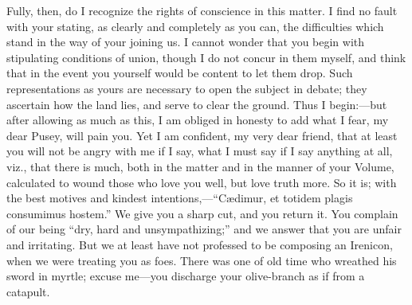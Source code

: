 Fully, then, do I recognize the rights of conscience in this matter.
I find no fault with your stating, as clearly and completely as you can,
the difficulties which stand in the way of your joining us. I cannot
wonder that you begin with stipulating conditions of union, though I do
not concur in them myself, and think that in the event you yourself
would be content to let them drop. Such representations as yours are
necessary to open the subject in debate; they ascertain how the land
lies, and serve to clear the ground. Thus I begin:—but after allowing
as much as this, I am obliged in honesty to add what I fear, my dear
Pusey, will pain you. Yet I am confident, my very dear friend, that at
least you will not be angry with me if I say, what I must say if I say
anything at all, viz., that there is much, both in the matter and in the
manner of your Volume, calculated to wound those who love you well, but
love truth more. So it is; with the best motives and kindest intentions,—``Cædimur,
et totidem plagis consumimus hostem.'' We give you a sharp cut,
and you return it. You complain of our being ``dry, hard and
unsympathizing;'' and we answer that you are unfair and irritating.
But we at least have not professed to be composing an Irenicon, when we
were treating you as foes. There was one of old time who wreathed his
sword in myrtle; excuse me—you discharge your olive-branch as if from
a catapult.


